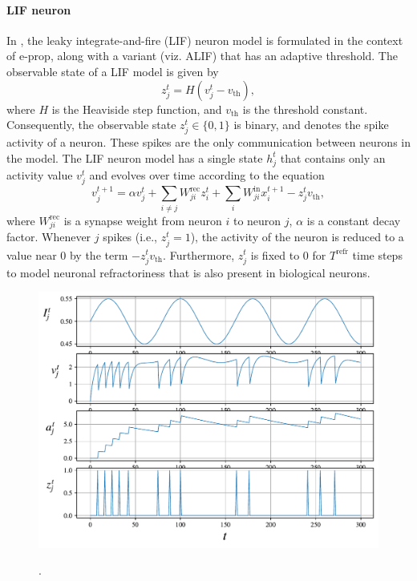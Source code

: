         \paragraph{LIF neuron}
        In \cite{bellec2020solution}, the leaky integrate-and-fire (LIF) neuron model is formulated in the context of e-prop, along with a variant (viz. ALIF) that has an adaptive threshold. 
        The observable state of a LIF model is given by
        \begin{equation}
        z^t_j = H\left(v_j^t-v_\text{th}\right),
        \end{equation}
        where $H$ is the Heaviside step function, and $v_\text{th}$ is the threshold constant.
        Consequently, the observable state $z^t_j \in \{0, 1\}$ is binary, and denotes the spike activity of a neuron.
        These spikes are the only communication between neurons in the model.
        The LIF neuron model has a single state $h^t_j$ that contains only an activity value $v^t_j$ and evolves over time according to the equation
        \begin{equation}\label{eq:alifV}
        v^{t+1}_j = \alpha v_j^t + \sum_{i\neq j}W^\text{rec}_{ji}z_i^t + \sum_i W^\text{in}_{ji}x_i^{t+1} - z_j^tv_
        \text{th},
        \end{equation}
        where $W^\text{rec}_{ji}$ is a synapse weight from neuron $i$ to neuron $j$, $\alpha$ is a constant decay factor.
        Whenever $j$ spikes (i.e., $z_j^t = 1$), the activity of the neuron is reduced to a value near 0 by the term $-z^t_jv_\text{th}$.
        Furthermore, $z^t_j$ is fixed to 0 for $T^\text{refr}$ time steps to model neuronal refractoriness that is also present in biological neurons.

        \begin{figure}[ht]
            \centering
            \includegraphics[width=\linewidth]{gfx/simplealif}
            \label{fig:simplealif}
            \caption{.}
        \end{figure}

